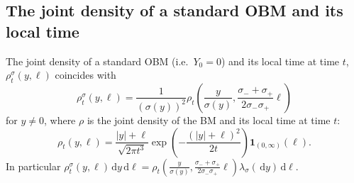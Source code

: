 \documentclass[12pt]{article}
\numberwithin{equation}{section}
\theoremstyle{definition}
\theoremstyle{remark}
\newcommand{\ind}[1]{\mathbf{1}_{#1}}
\newcommand{\vd}{\,\mathrm{d}}
\begin{document}
\subsection{The joint density of a standard OBM and its local time}
The joint density of a standard OBM (i.e.~$Y_0=0$) and its local time at time $t$,
$\rho^\sigma_t(y,\ell)$ coincides with
\begin{equation} \label{eq:OBMl}
		\rho^\sigma_t(y,\ell) = \frac{1}{(\sigma(y))^2} \rho_t\left(\frac{y}{\sigma(y)},  \frac{\sigma_-+\sigma_+}{2\sigma_-\sigma_+} \ell\right)
\end{equation}
for $y\neq 0$, where $\rho$ is the joint density of the BM and its local time at time $t$:
\begin{equation} \label{eq:BMl}
	\rho_t(y,\ell) = \frac{|y| + \ell}{\sqrt{2\pi t^3}} \exp\!\left(- \frac{(|y| + \ell)^2}{2 t}\right) \ind{(0,\infty)}(\ell).
\end{equation}
In particular
$
		\rho^\sigma_t(y,\ell) \vd y \vd \ell  =  \rho_t\left(\frac{y}{\sigma(y)},  \frac{\sigma_-+\sigma_+}{2\sigma_-\sigma_+} \ell\right) \lambda_\sigma(\!\vd y) \vd \ell.
$
%
\end{document}
